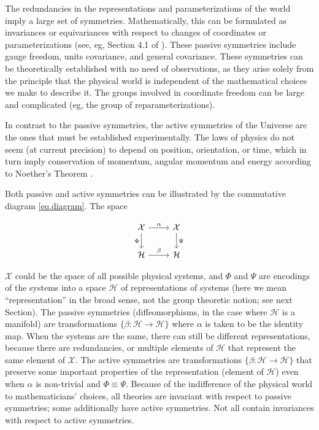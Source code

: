 \documentclass{article}
\begin{document}
The redundancies in the representations and parameterizations of the world imply a large set of symmetries.
Mathematically, this can be formulated as invariances or equivariances with respect to changes of coordinates or parameterizations (see, eg, Section 4.1 of \cite{rovelli2000loop}).
These passive symmetries include gauge freedom, units covariance, and general covariance.
These symmetries can be theoretically established with no need of observations, as they arise solely from the principle that the physical world is independent of the mathematical choices we make to describe it.
The groups involved in coordinate freedom can be large and complicated (eg, the group of reparameterizations).

In contrast to the passive symmetries, the active symmetries of the Universe are the ones that must be established experimentally.
The laws of physics do not seem (at current precision) to depend on position, orientation, or time, which in turn imply conservation of momentum, angular momentum and energy according to Noether's Theorem \cite{noether}.

Both passive and active symmetries can be illustrated by the commutative diagram \eqref{eq.diagram}. 
The space
\begin{wrapfigure}{r}{3.3cm}
\vspace{-3ex}
\begin{equation}\label{eq.diagram}
\begin{tikzcd}[]
  {\cal X}\arrow[r,"\alpha"] \arrow[d,"\Phi",swap] & {\cal X}  \arrow[d,"\Psi"]\\
{\cal H} \arrow[r,"\beta"]  & {\cal H} 
\end{tikzcd}
\end{equation}
\vspace{-3ex}
\end{wrapfigure}
$\mathcal X$ could be the space of all possible physical systems, and $\Phi$ and $\Psi$ are encodings of the systems into a space $\mathcal H$ of representations of systems (here we mean ``representation'' in the broad sense, not the group theoretic notion; see next Section).
The passive symmetries (diffeomorphisms, in the case where $\mathcal H$ is a manifold) are transformations $\{\beta:\mathcal H \to \mathcal H\}$ where $\alpha$ is taken to be the identity map.
When the systems are the same, there can still be different representations, because there are redundancies, or multiple elements of $\mathcal H$ that represent the same element of $\mathcal X$.
The active symmetries are transformations $\{\beta:\mathcal H \to \mathcal H\}$ that preserve some important properties of the representation (element of $\mathcal H$) even when $\alpha$ is non-trivial and $\Phi\equiv \Psi$.
Because of the indifference of the physical world to mathematicians' choices, all theories are invariant with respect to passive symmetries; some additionally have active symmetries.
Not all contain invariances with respect to active symmetries. 
\end{document}
